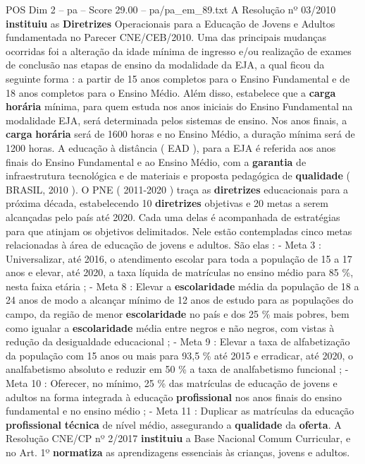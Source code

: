 \begin{textsample}{POS Dim 2 – pa – Score 29.00 – pa/pa\_em\_89.txt}
A Resolução nº 03/2010 \textbf{instituiu} as \textbf{Diretrizes} Operacionais para a Educação de Jovens e Adultos fundamentada no Parecer CNE/CEB/2010.
Uma das principais mudanças ocorridas foi a alteração da idade mínima de ingresso e/ou realização de exames de conclusão nas etapas de ensino da modalidade da EJA, a qual ficou da seguinte forma : a partir de 15 anos completos para o Ensino Fundamental e de 18 anos completos para o Ensino Médio.
Além disso, estabelece que a \textbf{carga} \textbf{horária} mínima, para quem estuda nos anos iniciais do Ensino Fundamental na modalidade EJA, será determinada pelos sistemas de ensino.
Nos anos finais, a \textbf{carga} \textbf{horária} será de 1600 horas e no Ensino Médio, a duração mínima será de 1200 horas.
A educação à distância ( EAD ), para a EJA é referida aos anos finais do Ensino Fundamental e ao Ensino Médio, com a \textbf{garantia} de infraestrutura tecnológica e de materiais e proposta pedagógica de \textbf{qualidade} ( BRASIL, 2010 ).
O PNE ( 2011-2020 ) traça as \textbf{diretrizes} educacionais para a próxima década, estabelecendo 10 \textbf{diretrizes} objetivas e 20 metas a serem alcançadas pelo país até 2020.
Cada uma delas é acompanhada de estratégias para que atinjam os objetivos delimitados.
Nele estão contempladas cinco metas relacionadas à área de educação de jovens e adultos.
São elas : - Meta 3 : Universalizar, até 2016, o atendimento escolar para toda a população de 15 a 17 anos e elevar, até 2020, a taxa líquida de matrículas no ensino médio para 85 \%, nesta faixa etária ; - Meta 8 : Elevar a \textbf{escolaridade} média da população de 18 a 24 anos de modo a alcançar mínimo de 12 anos de estudo para as populações do campo, da região de menor \textbf{escolaridade} no país e dos 25 \% mais pobres, bem como igualar a \textbf{escolaridade} média entre negros e não negros, com vistas à redução da desigualdade educacional ; - Meta 9 : Elevar a taxa de alfabetização da população com 15 anos ou mais para 93,5 \% até 2015 e erradicar, até 2020, o analfabetismo absoluto e reduzir em 50 \% a taxa de analfabetismo funcional ; - Meta 10 : Oferecer, no mínimo, 25 \% das matrículas de educação de jovens e adultos na forma integrada à educação \textbf{profissional} nos anos finais do ensino fundamental e no ensino médio ; - Meta 11 : Duplicar as matrículas da educação \textbf{profissional} \textbf{técnica} de nível médio, assegurando a \textbf{qualidade} da \textbf{oferta}.
A Resolução CNE/CP nº 2/2017 \textbf{instituiu} a Base Nacional Comum Curricular, e no Art. 1º \textbf{normatiza} as aprendizagens essenciais às crianças, jovens e adultos.

\end{textsample}
